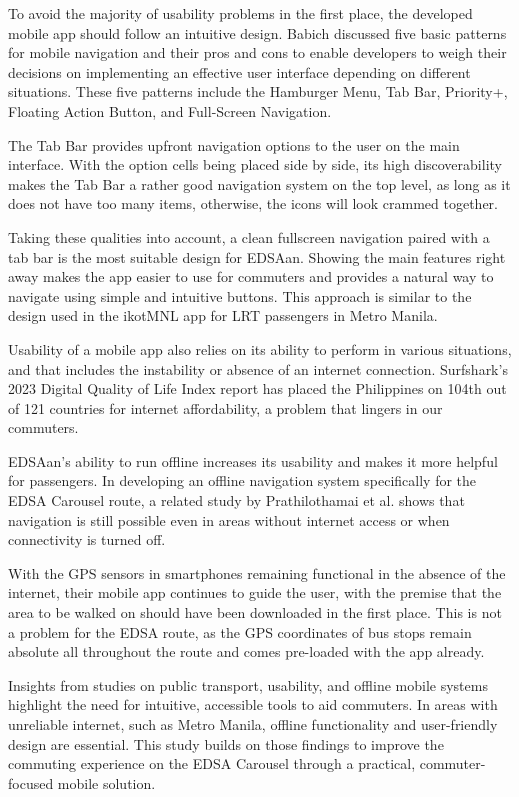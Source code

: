 \documentclass[journal]{./IEEE/IEEEtran}
\begin{document}
To avoid the majority of usability problems in the first place, the developed mobile app should follow an intuitive design. Babich discussed five basic patterns for mobile navigation \cite{Ref:003} and their pros and cons to enable developers to weigh their decisions on implementing an effective user interface depending on different situations. These five patterns include the Hamburger Menu, Tab Bar, Priority+, Floating Action Button, and Full-Screen Navigation.

The Tab Bar provides upfront navigation options to the user on the main interface. With the option cells being placed side by side, its high discoverability makes the Tab Bar a rather good navigation system on the top level, as long as it does not have too many items, otherwise, the icons will look crammed together.

Taking these qualities into account, a clean fullscreen navigation paired with a tab bar is the most suitable design for EDSAan. Showing the main features right away makes the app easier to use for commuters and provides a natural way to navigate using simple and intuitive buttons. This approach is similar to the design used in the ikotMNL app for LRT passengers \cite{Ref:008} in Metro Manila.

Usability of a mobile app also relies on its ability to perform in various situations, and that includes the instability or absence of an internet connection. Surfshark’s 2023 Digital Quality of Life Index report \cite{Ref:016} has placed the Philippines on 104th out of 121 countries for internet affordability, a problem that lingers in our commuters.

EDSAan’s ability to run offline increases its usability and makes it more helpful for passengers. In developing an offline navigation system specifically for the EDSA Carousel route, a related study by Prathilothamai et al. \cite{Ref:014} shows that navigation is still possible even in areas without internet access or when connectivity is turned off.

With the GPS sensors in smartphones remaining functional in the absence of the internet, their mobile app continues to guide the user, with the premise that the area to be walked on should have been downloaded in the first place. This is not a problem for the EDSA route, as the GPS coordinates of bus stops remain absolute all throughout the route and comes pre-loaded with the app already.

Insights from studies on public transport, usability, and offline mobile systems highlight the need for intuitive, accessible tools to aid commuters. In areas with unreliable internet, such as Metro Manila, offline functionality and user-friendly design are essential. This study builds on those findings to improve the commuting experience on the EDSA Carousel through a practical, commuter-focused mobile solution.
\end{document}
